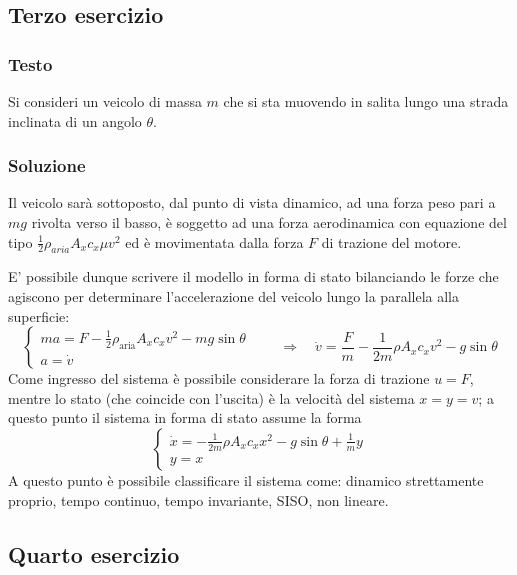 		
\subsection*{Terzo esercizio}
	\subsubsection{Testo}
		Si consideri un veicolo di massa $m$ che si sta muovendo in salita lungo una strada inclinata di un angolo $\theta$.
		\begin{center}
		\end{center}
		
	\subsubsection{Soluzione}
		Il veicolo sarà sottoposto, dal punto di vista dinamico, ad una forza peso pari a $mg$ rivolta verso il basso, è soggetto ad una forza aerodinamica con equazione del tipo $\frac 1 2 \rho_{aria} A_xc_x\mu v^2$ ed è movimentata dalla forza $F$ di trazione del motore.
		
		E' possibile dunque scrivere il modello in forma di stato bilanciando le forze che agiscono per determinare l'accelerazione del veicolo lungo la parallela alla superficie:
		\[ \begin{cases}
			m a = F - \frac 1 2 \rho_\textrm{aria} A_xc_x v^2 - mg \sin\theta \\
			a = \dot v
		\end{cases} \qquad \Rightarrow \quad \dot v = \frac F m - \frac 1 {2m} \rho A_xc_x v^2 - g \sin\theta\]
		Come ingresso del sistema è possibile considerare la forza di trazione $u=F$, mentre lo stato (che coincide con l'uscita) è la velocità del sistema $x = y = v$; a questo punto il sistema in forma di stato assume la forma
		\[ \begin{cases}
			\dot x =  - \frac 1 {2m} \rho A_xc_x x^2 - g \sin\theta + \frac 1 m y  \\ y = x
		\end{cases} \]
		A questo punto è possibile classificare il sistema come: dinamico strettamente proprio, tempo continuo, tempo invariante, SISO, non lineare.

\subsection*{Quarto esercizio}
